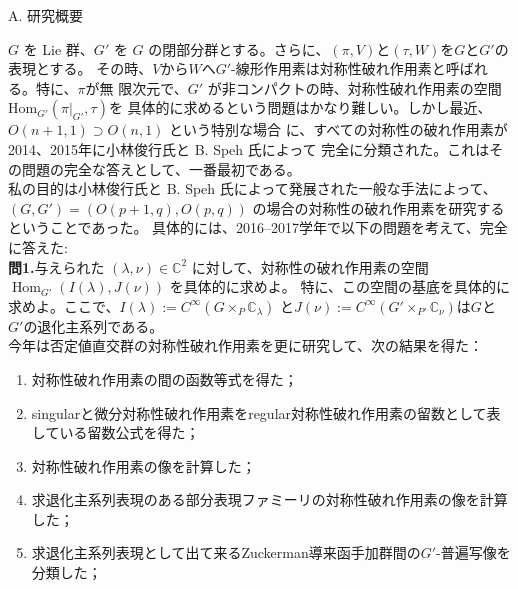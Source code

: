 \documentclass[a4j,twocolumn]{jarticle}
\begin{document}
\vspace{0.2cm}
\noindent
A. 研究概要

\vspace{0.1cm}

$G$ を Lie 群、$G'$ を $G$ の閉部分群とする。さらに、$(\pi,V)$と$(\tau,W)$を$G$と$G'$の表現とする。
その時、$V$から$W$へ$G'$-線形作用素は対称性破れ作用素と呼ばれる。特に、$\pi$が無
限次元で、$G'$ が非コンパクトの時、対称性破れ作用素の空間$\mbox{Hom}_{G'}(\pi\big|_{G'},\tau)$を
具体的に求めるという問題はかなり難しい。しかし最近、$O(n + 1, 1) \supset O(n, 1)$ という特別な場合
に、すべての対称性の破れ作用素が2014、2015年に小林俊行氏と B. Speh 氏によって
完全に分類された。これはその問題の完全な答えとして、一番最初である。\\
私の目的は小林俊行氏と B. Speh 氏によって発展された一般な手法によって、$(G, G') = (O(p+1,q),O(p,q))$
の場合の対称性の破れ作用素を研究するということであった。
具体的には、2016--2017学年で以下の問題を考えて、完全に答えた:\\
{\noindent}\textbf{問\textbf{1}.}{与えられた $( \lambda, \nu) \in
\mathbb{C}^2$
に対して、対称性の破れ作用素の空間 $\operatorname{Hom}_{G'}(I(\lambda),J(\nu))$ を具体的に求めよ。
特に、この空間の基底を具体的に求めよ。ここで、$I(\lambda):=C^{\infty}\left(  G\times_P\mathbb{C}_\lambda\right)$
と$J(\nu):=C^{\infty}\left( G'\times_{P'}\mathbb{C}_{\nu} \right)$は$G$と
$G'$の退化主系列である。}\\
今年は否定値直交群の対称性破れ作用素を更に研究して、次の結果を得た：
\begin{enumerate}
	\item 対称性破れ作用素の間の函数等式を得た；
	\item singularと微分対称性破れ作用素をregular対称性破れ作用素の留数として表している留数公式を得た；
	\item 対称性破れ作用素の像を計算した；
	\item 求退化主系列表現のある部分表現ファミーリの対称性破れ作用素の像を計算した；
	\item 求退化主系列表現として出て来るZuckerman導来函手加群間の$G'$-普遍写像を分類した；
\end{enumerate}
\end{document}
